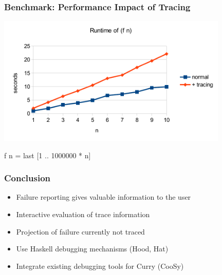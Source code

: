 \documentclass[
,xcolor=dvipsnames
]{beamer}
\begin{document}
\begin{frame}%
\frametitle{Benchmark: Performance Impact of Tracing}

\begin{center}
\includegraphics[width=11cm]{benchmark}
\end{center}

\vspace{-.5cm}

\begin{curry}
f n = last [1 .. 1000000 * n]
\end{curry}

\bigskip

\end{frame}


\begin{frame}[fragile]%
\frametitle{Conclusion}

\begin{itemize}
\item Failure reporting gives valuable information to the user
\item Interactive evaluation of trace information
\item Projection of failure currently not traced
\end{itemize}

\begin{itemize}
\item Use Haskell debugging mechanisms (Hood, Hat)
\item Integrate existing debugging tools for Curry (CooSy)
\end{itemize}

\end{frame}
\end{document}
